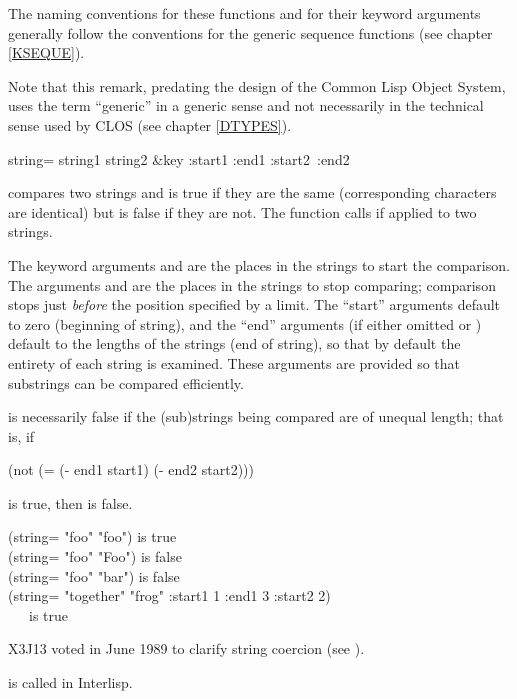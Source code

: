 The naming conventions for these functions and for their keyword
arguments generally follow the conventions for the generic sequence
functions (see chapter \ref{KSEQUE}).
\begin{new}
Note that this remark, predating the design of the Common Lisp Object System,
uses the term ``generic'' in a generic sense and not necessarily
in the technical sense used by CLOS
(see chapter \ref{DTYPES}).
\end{new}

\begin{defun}[Function]
string= string1 string2 &key :start1 :end1 :start2~:end2

 compares two strings and is true if
they are the same (corresponding characters are identical)
but is false if they are not.
The function  calls  if
applied to two strings.

The keyword arguments  and  are the places
in the strings to start the comparison.
The arguments  and  are the
places in the strings to stop comparing; comparison stops just
{\it before} the position specified by a limit.
The ``start'' arguments default to zero (beginning of string),
and the ``end'' arguments (if either omitted or {\false})
default to the lengths of the strings (end of string),
so that by default the entirety of each string is examined.
These arguments are provided so that substrings can be compared
efficiently.

 is necessarily false if the (sub)strings
being compared are of unequal length; that is, if
\begin{lisp}
(not (= (- end1 start1) (- end2 start2)))
\end{lisp}
is true, then  is false.

\begin{lisp}
(string= "foo" "foo") {\rm is true} \\
(string= "foo" "Foo") {\rm is false} \\
(string= "foo" "bar") {\rm is false} \\
(string= "together" "frog" :start1 1 :end1 3 :start2 2) \\
~~~{\rm is true}
\end{lisp}

\begin{newer}
X3J13 voted in June 1989 
to clarify string coercion (see ).
\end{newer}

\beforenoterule
\begin{incompatibility}
 is called  in Interlisp.
\end{incompatibility}
\afternoterule
\end{defun}

